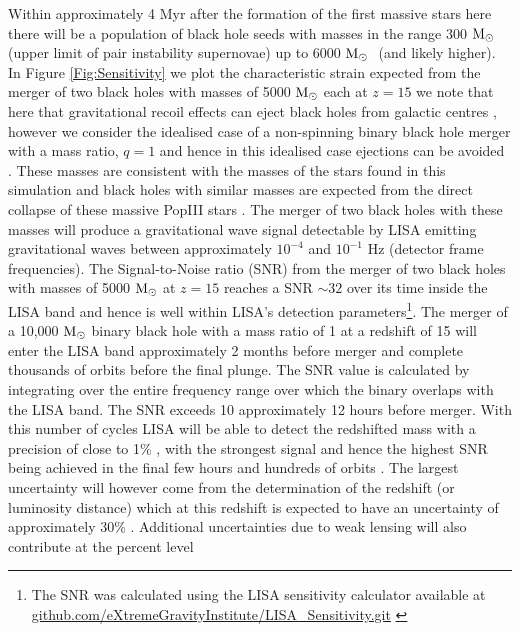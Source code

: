 \documentclass[twocolumn,iop,revtex4]{openjournal}
\newcommand{\msolar} {$\rm{M_{\odot}}~$}
\begin{document}
\noindent Within approximately 4 Myr after the formation of the first massive stars here there
will be a population of black hole seeds with masses in the range 300 \msolar (upper limit of pair
instability supernovae) up to 6000 \msolar
(and likely higher). In Figure \ref{Fig:Sensitivity} we plot the characteristic strain
expected from the merger of two black holes with masses of 5000 \msolar each at $z = 15$
we note that here that gravitational recoil effects can eject black holes from galactic
centres \citep[e.g.][]{Gultekin_2006}, however we consider the idealised case of a non-spinning
  binary black hole merger with a mass ratio, $q = 1$ and hence in this
  idealised case ejections
  can be avoided \citep{Holley-Bockelmann_2008, Morawski_2018, Dunn_2020}.
These masses are consistent with the masses of the stars found in this simulation and black holes
with similar masses are expected from the direct collapse of these massive PopIII
stars \citep{Heger_2003}. The merger of two black holes with these masses will produce a
gravitational wave signal detectable by LISA \citep{eLISA, Sesana_2016, Cornish_2020} emitting
gravitational waves between approximately $10^{-4}$ and $10^{-1}$ Hz (detector frame frequencies). The
Signal-to-Noise ratio (SNR) from the merger of two black holes with masses of 5000 \msolar at $z = 15$
reaches a SNR $\sim 32$ over its time inside the LISA band and hence is
well within LISA's detection parameters\footnote{The SNR was calculated
  using the LISA sensitivity calculator available at
  \url{github.com/eXtremeGravityInstitute/LISA_Sensitivity.git} \citep{Robson_2019}}.
The merger of a 10,000 \msolar binary black hole with a mass ratio of 1 at a redshift of 15
will enter the LISA band approximately 2 months before merger and complete
thousands of orbits before the final plunge. The SNR value is calculated by integrating
  over the entire frequency range over which the binary overlaps with the LISA band. The
SNR exceeds 10 approximately 12 hours before merger.
With this number of cycles LISA will be able to detect
the redshifted mass with a precision of close to 1\% \citep{Sesana_2013}, with the
  strongest signal and hence the highest SNR being achieved in the final few hours and
  hundreds of orbits \citep{Robson_2019}. The largest uncertainty
will however come from the determination of the redshift (or luminosity distance) which at this
redshift is expected to have an uncertainty of approximately 30\% \citep{Sesana_2013}. Additional
uncertainties due to weak lensing will also contribute at the percent level
\citep{Shapiro_2010, Petiteau_2011}
\end{document}
